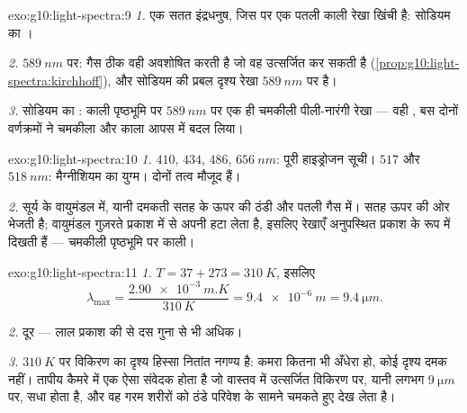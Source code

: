 \begin{solution}{exo:g10:light-spectra:9}
\emph{1.} एक सतत इंद्रधनुष, जिस पर एक पतली काली रेखा खिंची है: सोडियम
का ।

\emph{2.} $\qty{589}{nm}$ पर: गैस ठीक वही  अवशोषित करती है
जो वह उत्सर्जित कर सकती है (\cref{prop:g10:light-spectra:kirchhoff}), और सोडियम की प्रबल दृश्य रेखा
$\qty{589}{nm}$ पर है।

\emph{3.} सोडियम का : काली पृष्ठभूमि पर
$\qty{589}{nm}$ पर एक ही चमकीली पीली-नारंगी रेखा --- वही ,
बस दोनों वर्णक्रमों ने चमकीला और काला आपस में बदल लिया।
\end{solution}

\begin{solution}{exo:g10:light-spectra:10}
\emph{1.} $410$, $434$, $486$, $\qty{656}{nm}$: पूरी हाइड्रोजन सूची। $517$
और $\qty{518}{nm}$: मैग्नीशियम का युग्म। दोनों तत्व मौजूद हैं।

\emph{2.} सूर्य के वायुमंडल में, यानी दमकती सतह के ऊपर की ठंडी और पतली
गैस में। सतह ऊपर की ओर  भेजती है; वायुमंडल गुज़रते
प्रकाश में से अपनी  हटा लेता है, इसलिए रेखाएँ
अनुपस्थित प्रकाश के रूप में दिखती हैं --- चमकीली पृष्ठभूमि पर काली।
\end{solution}

\begin{solution}{exo:g10:light-spectra:11}
\emph{1.} $T = 37 + 273 = \qty{310}{K}$, इसलिए
\[
\lambda_{\max} = \frac{\qty{2.90e-3}{m.K}}{\qty{310}{K}}
= \qty{9.4e-6}{m} = \qty{9.4}{\micro m}.
\]

\emph{2.} दूर  --- लाल प्रकाश की  से
दस गुना से भी अधिक।

\emph{3.} $\qty{310}{K}$ पर विकिरण का दृश्य हिस्सा नितांत नगण्य है: कमरा कितना
भी अँधेरा हो, कोई दृश्य दमक नहीं। तापीय कैमरे में एक ऐसा संवेदक होता है
जो वास्तव में उत्सर्जित विकिरण पर, यानी लगभग $\qty{9}{\micro m}$ पर, सधा होता है,
और वह गरम शरीरों को ठंडे परिवेश के सामने चमकते हुए देख लेता है।
\end{solution}

